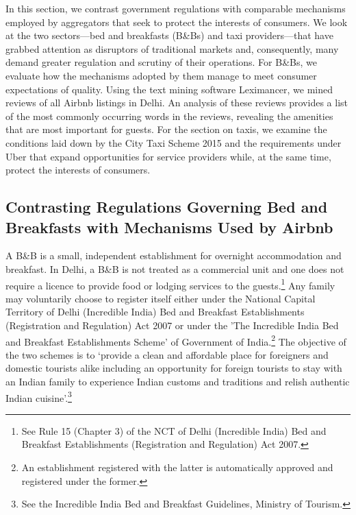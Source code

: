 \documentclass[a4paper, 12pt, twoside]{article}
\begin{document}
In this section, we contrast government regulations with comparable mechanisms employed by aggregators that seek to protect the interests of consumers. We look at the two sectors—bed and breakfasts (B\&Bs) and taxi providers—that have grabbed attention as disruptors of traditional markets and, consequently, many demand greater regulation and scrutiny of their operations. For B\&Bs, we evaluate how the mechanisms adopted by them manage to meet consumer expectations of quality. Using the text mining software Leximancer, we mined reviews of all Airbnb listings in Delhi. An analysis of these reviews provides a list of the most commonly occurring words in the reviews, revealing the amenities that are most important for guests. For the section on taxis, we examine the conditions laid down by the City Taxi Scheme 2015 and the requirements under Uber that expand opportunities for service providers while, at the same time, protect the interests of consumers.           
                    
           
                    \subsection{Contrasting Regulations Governing Bed and Breakfasts with Mechanisms Used by Airbnb}

A B\&B is a small, independent establishment for overnight accommodation and breakfast. In Delhi, a B\&B is not treated as a commercial unit and one does not require a licence to provide food or lodging services to the guests.\footnote{See Rule 15 (Chapter 3) of  the NCT of Delhi (Incredible India) Bed and Breakfast Establishments (Registration and Regulation) Act 2007.} Any family may voluntarily choose to register itself either under the National Capital Territory of Delhi (Incredible India) Bed and Breakfast Establishments (Registration and Regulation) Act 2007 or under the 'The Incredible India Bed and Breakfast Establishments Scheme’ of Government of India.\footnote{An establishment registered with the latter is automatically approved and registered under the former.}  The objective of the two schemes is to ‘provide a clean and affordable place for foreigners and domestic tourists alike including an opportunity for foreign tourists to stay with an Indian family to experience Indian customs and traditions and relish authentic Indian cuisine’.\footnote{See the Incredible India Bed and Breakfast Guidelines, Ministry of Tourism.}  \\
                    
\end{document}
